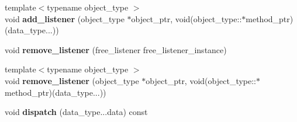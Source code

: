 \begin{DoxyCompactItemize}
\item 
\hypertarget{classxstd_1_1event_aa58880f86e0e2e5653df91692f221604}{{\footnotesize template$<$typename object\-\_\-type $>$ }\\void {\bfseries add\-\_\-listener} (object\-\_\-type $\ast$object\-\_\-ptr, void(object\-\_\-type\-::$\ast$method\-\_\-ptr)(data\-\_\-type...))}\label{classxstd_1_1event_aa58880f86e0e2e5653df91692f221604}

\item 
\hypertarget{classxstd_1_1event_a19e40e6d6af2d565ef741ecfbfb2fda7}{void {\bfseries remove\-\_\-listener} (free\-\_\-listener free\-\_\-listener\-\_\-instance)}\label{classxstd_1_1event_a19e40e6d6af2d565ef741ecfbfb2fda7}

\item 
\hypertarget{classxstd_1_1event_a2ecf3e9a39708db0c28281dbb32d12da}{{\footnotesize template$<$typename object\-\_\-type $>$ }\\void {\bfseries remove\-\_\-listener} (object\-\_\-type $\ast$object\-\_\-ptr, void(object\-\_\-type\-::$\ast$method\-\_\-ptr)(data\-\_\-type...))}\label{classxstd_1_1event_a2ecf3e9a39708db0c28281dbb32d12da}

\item 
\hypertarget{classxstd_1_1event_a60e1b1471f7c50f764fcb8388ca56b47}{void {\bfseries dispatch} (data\-\_\-type...\-data) const }\label{classxstd_1_1event_a60e1b1471f7c50f764fcb8388ca56b47}

\end{DoxyCompactItemize}
